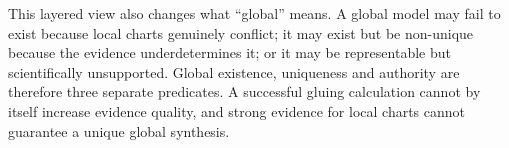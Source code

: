 This layered view also changes what ``global'' means. A global model may fail to exist because local charts genuinely conflict; it may exist but be non-unique because the evidence underdetermines it; or it may be representable but scientifically unsupported. Global existence, uniqueness and authority are therefore three separate predicates. A successful gluing calculation cannot by itself increase evidence quality, and strong evidence for local charts cannot guarantee a unique global synthesis.
